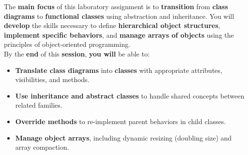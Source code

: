 The \textbf{main focus} of this laboratory assignment is to \textbf{transition} from \textbf{class diagrams} to \textbf{functional classes} using abstraction and inheritance. You will \textbf{develop} the skills necessary to define \textbf{hierarchical object structures}, \textbf{implement specific behaviors}, and \textbf{manage arrays of objects} using the principles of object-oriented programming. \\

By the \textbf{end} of this \textbf{session}, \textbf{you will} be able to:

\begin{itemize}

    \item \textbf{Translate class diagrams} into \textbf{classes} with appropriate attributes, visibilities, and methods.

    \item \textbf{Use inheritance and abstract classes} to handle shared concepts between related families.

    \item \textbf{Override methods} to re-implement parent behaviors in child classes.

    \item \textbf{Manage object arrays}, including dynamic resizing (doubling size) and array compaction.

\end{itemize}
